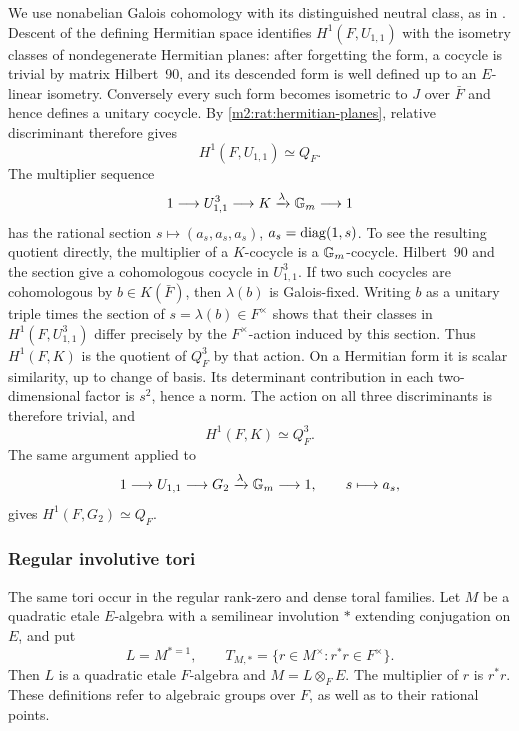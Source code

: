 We use nonabelian Galois cohomology with its distinguished neutral
class, as in \cite{SerreGC}.  Descent of the defining Hermitian
space identifies $H^1(F,U_{1,1})$ with the isometry classes of
nondegenerate Hermitian planes: after forgetting the form, a
cocycle is trivial by matrix Hilbert~90, and its descended form
is well defined up to an $E$-linear isometry. Conversely every
such form becomes isometric to $J$ over $\bar F$ and hence
defines a unitary cocycle. By \cref{m2:rat:hermitian-planes},
relative discriminant therefore gives
\[
 H^1(F,U_{1,1})\simeq Q_F.
\]
The multiplier sequence
\begin{equation}\label{m2:rat:ambient-sequence}
 1\longrightarrow U_{1,1}^3\longrightarrow K
 \xrightarrow{\lambda}\mathbb G_m\longrightarrow1
\end{equation}
has the rational section
$s\mapsto(a_s,a_s,a_s)$, $a_s=\operatorname{diag}(1,s)$.
To see the resulting quotient directly, the multiplier of a
$K$-cocycle is a $\mathbb G_m$-cocycle. Hilbert~90 and the section
give a cohomologous cocycle in $U_{1,1}^3$. If two such cocycles
are cohomologous by $b\in K(\bar F)$, then $\lambda(b)$ is
Galois-fixed. Writing $b$ as a unitary triple times the section
of $s=\lambda(b)\in F^\times$ shows that their classes in
$H^1(F,U_{1,1}^3)$ differ precisely by the $F^\times$-action
induced by this section. Thus $H^1(F,K)$ is the quotient of
$Q_F^3$ by that action. On a Hermitian form it is scalar
similarity, up to change of basis.  Its determinant contribution in
each two-dimensional factor is $s^2$, hence a norm.  The action
on all three discriminants is therefore trivial, and
\begin{equation}\label{m2:rat:H1K}
 H^1(F,K)\simeq Q_F^3.
\end{equation}
The same argument applied to
\[
 1\longrightarrow U_{1,1}\longrightarrow G_2
 \xrightarrow{\lambda}\mathbb G_m\longrightarrow1,
 \qquad s\longmapsto a_s,
\]
gives $H^1(F,G_2)\simeq Q_F$.

\subsubsection{Regular involutive tori}



The same tori occur in the regular rank-zero and dense toral
families.  Let $M$ be a quadratic etale $E$-algebra with a
semilinear involution $*$ extending conjugation on $E$, and put
\[
 L=M^{*=1},\qquad
 T_{M,*}=\{r\in M^\times:r^*r\in F^\times\}.
\]
Then $L$ is a quadratic etale $F$-algebra and $M=L\otimes_FE$.
The multiplier of $r$ is $r^*r$.  These definitions refer to
algebraic groups over $F$, as well as to their rational points.

